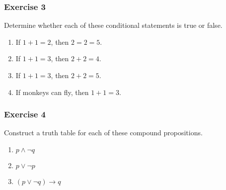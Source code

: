 \documentclass{beamer}
\begin{document}
\begin{frame}
    \frametitle{Exercise 3}
    Determine whether each of these conditional statements is true or false.
    \begin{enumerate}
        \item If $1+1=2$, then $2=2=5$.
        \item If $1+1 =3$, then $2+2=4$.
        \item If $1+1 = 3$, then $2+2 =5$.
        \item If monkeys can fly, then $1+1 =3$.
    \end{enumerate}
\end{frame}
\begin{frame}
    \frametitle{Exercise 4}
    Construct a truth table for each of these compound propositions.
    \begin{enumerate}
        \item $p \wedge \neg q$
        \item $p \vee \neg p$
        \item $(p \vee \neg q)\rightarrow q$
    \end{enumerate}
\end{frame}
\end{document}
